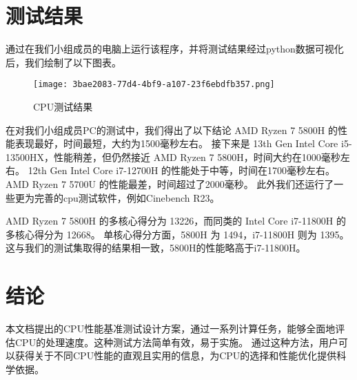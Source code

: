 \documentclass{ctexart}
\begin{document}
\section{测试结果}
通过在我们小组成员的电脑上运行该程序，并将测试结果经过python数据可视化后，我们绘制了以下图表。
\begin{figure}[H]
    \centering
    \texttt{[image: 3bae2083-77d4-4bf9-a107-23f6ebdfb357.png]}
    \caption{CPU测试结果}
    \label{fig:image1}
    \end{figure}
在对我们小组成员PC的测试中，我们得出了以下结论
AMD Ryzen 7 5800H 的性能表现最好，时间最短，大约为1500毫秒左右。
接下来是 13th Gen Intel Core i5-13500HX，性能稍差，但仍然接近 AMD Ryzen 7 5800H，时间大约在1000毫秒左右。
12th Gen Intel Core i7-12700H 的性能处于中等，时间在1700毫秒左右。
AMD Ryzen 7 5700U 的性能最差，时间超过了2000毫秒。
此外我们还运行了一些更为完善的cpu测试软件，例如Cinebench R23。

AMD Ryzen 7 5800H 的多核心得分为 13226，而同类的 Intel Core i7-11800H 的多核心得分为 12668。
单核心得分方面，5800H 为 1494，i7-11800H 则为 1395。
这与我们的测试集取得的结果相一致，5800H的性能略高于i7-11800H。
\section{结论}
本文档提出的CPU性能基准测试设计方案，通过一系列计算任务，能够全面地评估CPU的处理速度。这种测试方法简单有效，易于实施。
通过这种方法，用户可以获得关于不同CPU性能的直观且实用的信息，为CPU的选择和性能优化提供科学依据。
\end{document}
